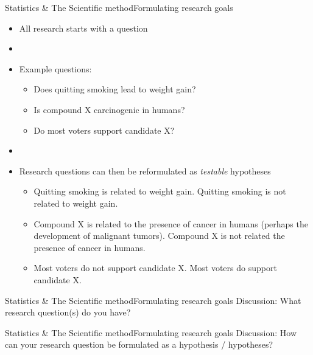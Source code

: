 \documentclass[xcolor=dvipsnames]{beamer}
\begin{document}
\begin{frame}{Statistics \& The Scientific method}{Formulating research goals}
\begin{itemize}
	\item All research starts with a question
	\item[]
	\item Example questions: 
	\begin{itemize}
		\item Does quitting smoking lead to weight gain?
		\item Is compound X carcinogenic in humans?
		\item Do most voters support candidate X?
	\end{itemize}
	\item[]
	\item Research questions can then be reformulated as \emph{testable} hypotheses
	\begin{itemize}
		\item Quitting smoking is related to weight gain. Quitting smoking is not related to weight gain.
		\item Compound X is related to the presence of cancer in humans (perhaps the development of malignant tumors). Compound X is not related the presence of cancer in humans.
		\item Most voters do not support candidate X. Most voters do support candidate X.
	\end{itemize}
\end{itemize}
\end{frame}

\begin{frame}{Statistics \& The Scientific method}{Formulating research goals}
	\vspace{-12pt}
	{\Huge Discussion: What research question(s) do you have?}
\end{frame}

\begin{frame}{Statistics \& The Scientific method}{Formulating research goals}
	\vspace{-12pt}
	{\Huge Discussion: How can your research question be formulated as a hypothesis / hypotheses?}
\end{frame}
\end{document}
